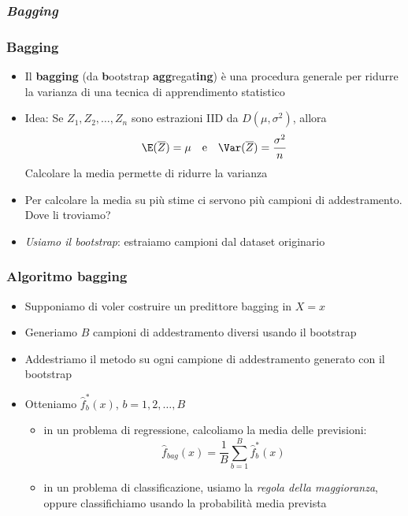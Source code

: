 \subsubsection[Bagging]{\textit{Bagging}}
\begin{frame}
	\frametitle{Bagging}
	
	\begin{itemize}
		\item Il \textbf{bagging} (da \textbf{b}ootstrap \textbf{agg}regat\textbf{ing}) è una procedura generale per ridurre la varianza di una tecnica di apprendimento statistico
		\item Idea: Se $Z_1,Z_2,\ldots,Z_n$ sono estrazioni IID da $D(\mu,\sigma^2)$, allora 
		\[
		\E(\overline Z) = \mu \quad \mbox{e} \quad \Var(\overline Z) = \frac{\sigma^2}{n}
		\]
		Calcolare la media permette di ridurre la varianza
		\item Per calcolare la media su più stime ci servono più campioni di addestramento. Dove li troviamo?
		\item \emph{Usiamo il bootstrap}: estraiamo campioni dal dataset originario
	\end{itemize}
\end{frame}
	
	
\begin{frame}
	\frametitle{Algoritmo bagging}
	
	\begin{itemize}
		\item Supponiamo di voler costruire un predittore bagging in $X=x$
		\item Generiamo $B$ campioni di addestramento diversi usando il bootstrap
		\item Addestriamo il metodo su ogni campione di addestramento generato con il bootstrap
		\item Otteniamo $\widehat f_b^*(x)$, $b=1,2,\ldots,B$
			\begin{itemize}
				\item in un problema di regressione, calcoliamo la media delle previsioni:
				\[
				\widehat f_{bag}(x) = \frac{1}{B} \sum_{b=1}^B \widehat f_b^*(x)
				\]
				
				\item in un problema di classificazione, usiamo la \emph{regola della maggioranza}, oppure classifichiamo usando la probabilità media prevista
			\end{itemize}
	\end{itemize}
\end{frame}


